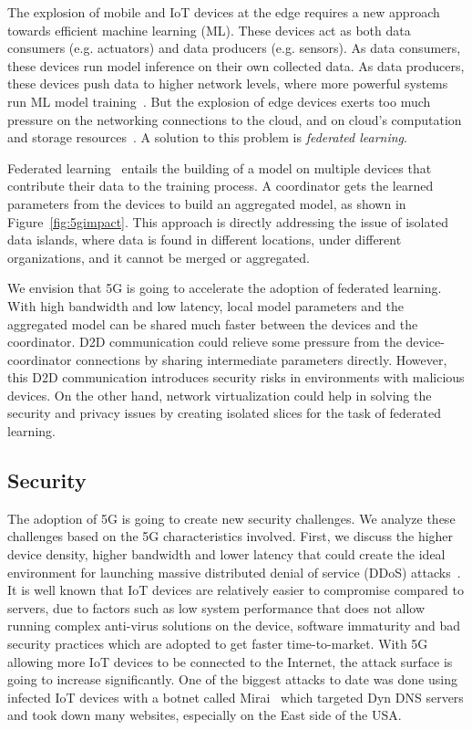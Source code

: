 \documentclass[11pt]{article}
\begin{document}
The explosion of mobile and IoT devices at the edge requires a new approach
towards efficient machine learning (ML). These devices act as both data
consumers (e.g. actuators) and data producers (e.g. sensors). As data consumers,
these devices run model inference on their own collected data. As data
producers, these devices push data to higher network levels, where more powerful
systems run ML model training~\cite{singa15}. But the explosion of edge devices
exerts too much pressure on the networking connections to the cloud, and on
cloud's computation and storage resources~\cite{5g_our_article}. A solution to
this problem is \textit{federated learning}.


Federated learning~\cite{federated_learning_arxiv_16} entails the building of a
model on multiple devices that contribute their data to the training process. A
coordinator gets the learned parameters from the devices to build an aggregated
model, as shown in Figure~\ref{fig:5gimpact}. This approach is directly
addressing the issue of isolated data islands, where data is found in different
locations, under different organizations, and it cannot be merged or aggregated.

We envision that 5G is going to accelerate the adoption of federated learning.
With high bandwidth and low latency, local model parameters and the aggregated
model can be shared much faster between the devices and the coordinator. D2D
communication could relieve some pressure from the device-coordinator
connections by sharing intermediate parameters directly. However, this D2D
communication introduces security risks in environments with malicious devices.
On the other hand, network virtualization could help in solving the security and
privacy issues by creating isolated slices for the task of federated learning.
\vspace{-2mm}
\subsection{Security}
\vspace{-1mm}

The adoption of 5G is going to create new security challenges. We analyze these
challenges based on the 5G characteristics involved. First, we discuss the
higher device density, higher bandwidth and lower latency that could create the
ideal environment for launching massive distributed denial of service (DDoS)
attacks~\cite{ddos_botnet}. It is well known that IoT devices are relatively
easier to compromise compared to servers, due to factors such as low system
performance that does not allow running complex anti-virus solutions on the
device, software immaturity and bad security practices which are adopted to get
faster time-to-market. With 5G allowing more IoT devices to be connected to the
Internet, the attack surface is going to increase significantly. One of the
biggest attacks to date was done using infected IoT devices with a botnet called
Mirai~\cite{ddos_botnet} which targeted Dyn DNS servers and took down many
websites, especially on the East side of the USA.
\end{document}
